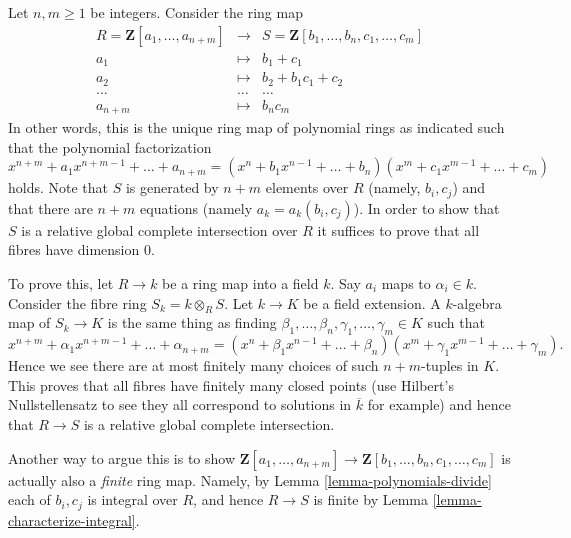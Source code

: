 \begin{example}
\label{example-factor-polynomials}
Let $n , m \geq 1$ be integers. Consider the ring map
\begin{eqnarray*}
R = \mathbf{Z}[a_1, \ldots, a_{n + m}]
& \longrightarrow &
S = \mathbf{Z}[b_1, \ldots, b_n, c_1, \ldots, c_m] \\
a_1 & \longmapsto & b_1 + c_1 \\
a_2 & \longmapsto & b_2 + b_1 c_1 + c_2 \\
\ldots & \ldots & \ldots \\
a_{n + m} & \longmapsto & b_n c_m
\end{eqnarray*}
In other words, this is the unique ring map of polynomial rings
as indicated such that the polynomial factorization
$$
x^{n + m} + a_1 x^{n + m - 1} + \ldots + a_{n + m}
=
(x^n + b_1 x^{n - 1} + \ldots + b_n)
(x^m + c_1 x^{m - 1} + \ldots + c_m)
$$
holds. Note that $S$ is generated by $n + m$ elements over $R$
(namely, $b_i, c_j$) and that there are $n + m$ equations
(namely $a_k = a_k(b_i, c_j)$). In order to show that
$S$ is a relative global complete intersection over $R$ it suffices
to prove that all fibres have dimension $0$.

\medskip\noindent
To prove this, let $R \to k$ be a
ring map into a field $k$. Say $a_i$ maps to $\alpha_i \in k$.
Consider the fibre ring $S_k = k \otimes_R S$. Let $k \to K$ be
a field extension. A $k$-algebra map of $S_k \to K$ is the same thing as
finding $\beta_1, \ldots, \beta_n, \gamma_1, \ldots, \gamma_m \in K$
such that
$$
x^{n + m} + \alpha_1 x^{n + m - 1} + \ldots + \alpha_{n + m}
=
(x^n + \beta_1 x^{n - 1} + \ldots + \beta_n)
(x^m + \gamma_1 x^{m - 1} + \ldots + \gamma_m).
$$
Hence we see there are at most finitely many choices of
such $n + m$-tuples in $K$. This proves that all fibres
have finitely many closed points (use Hilbert's Nullstellensatz
to see they all correspond to solutions in $\overline{k}$ for example)
and hence that $R \to S$ is a relative global complete intersection.

\medskip\noindent
Another way to argue this is to show
$\mathbf{Z}[a_1, \ldots, a_{n + m}] \to
\mathbf{Z}[b_1, \ldots, b_n, c_1, \ldots, c_m]$ is actually
also a {\it finite} ring map. Namely, by Lemma \ref{lemma-polynomials-divide}
each of $b_i, c_j$ is integral over $R$, and hence $R \to S$ is
finite by Lemma \ref{lemma-characterize-integral}.
\end{example}

